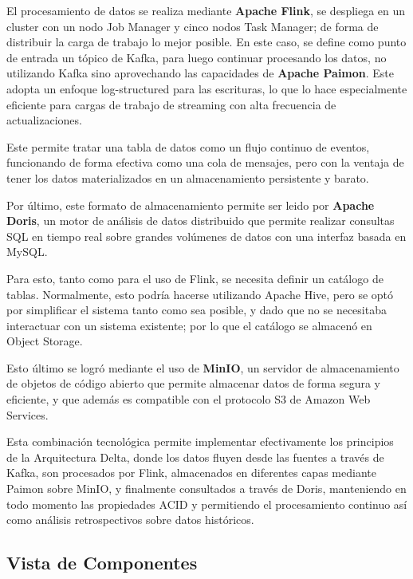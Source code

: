 El procesamiento de datos se realiza mediante \textbf{Apache Flink}, se despliega en un cluster con un nodo Job Manager 
y cinco nodos Task Manager; de forma de distribuir la carga de trabajo lo mejor posible.
En este caso, se define como punto de entrada un tópico de Kafka, para luego continuar procesando los datos, 
no utilizando Kafka sino aprovechando las capacidades de \textbf{Apache Paimon}. 
Este adopta un enfoque log-structured para las escrituras, 
lo que lo hace especialmente eficiente para cargas de trabajo de streaming con alta frecuencia de actualizaciones.

Este permite tratar una tabla de datos como un flujo continuo de eventos, funcionando de forma efectiva como 
una cola de mensajes, pero con la ventaja de tener los datos materializados en un almacenamiento persistente y barato.

Por último, este formato de almacenamiento permite ser leido por \textbf{Apache Doris}, un motor de análisis de datos
distribuido que permite realizar consultas SQL en tiempo real sobre grandes volúmenes de datos con una interfaz basada en MySQL.

Para esto, tanto como para el uso de Flink, se necesita definir un catálogo de tablas.
Normalmente, esto podría hacerse utilizando Apache Hive, pero se optó por simplificar el sistema tanto como sea posible, 
y dado que no se necesitaba interactuar con un sistema existente; por lo que el catálogo se almacenó en Object Storage.

Esto último se logró mediante el uso de \textbf{MinIO}, un servidor de almacenamiento de objetos de código abierto que
permite almacenar datos de forma segura y eficiente, y que además es compatible con el protocolo S3 de Amazon Web Services.

Esta combinación tecnológica permite implementar efectivamente los principios de la Arquitectura Delta, 
donde los datos fluyen desde las fuentes a través de Kafka, son procesados por Flink, 
almacenados en diferentes capas mediante Paimon sobre MinIO, y finalmente consultados a través de Doris, 
manteniendo en todo momento las propiedades ACID 
y permitiendo el procesamiento continuo así como análisis retrospectivos sobre datos históricos.

\subsection{Vista de Componentes}

